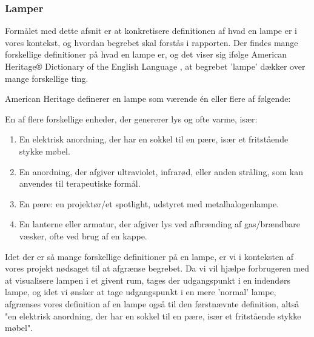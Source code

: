 \subsubsection{Lamper}
Formålet med dette afsnit er at konkretisere definitionen af hvad en lampe er i vores kontekst, og hvordan begrebet skal forstås i rapporten.
Der findes mange forskellige definitioner på hvad en lampe er, og det viser sig ifølge American Heritage® Dictionary of the English Language \cite{american_heritage}, at begrebet 'lampe' dækker over mange forskellige ting. 

American Heritage definerer en lampe som værende én eller flere af følgende:

En af flere forskellige enheder, der genererer lys og ofte varme, især:
\begin{enumerate}
    \item En elektrisk anordning, der har en sokkel til en pære, især et fritstående stykke møbel.
    \item En anordning, der afgiver ultraviolet, infrarød, eller anden stråling, som kan anvendes til terapeutiske formål.
    \item En pære: en projektør/et spotlight, udstyret med metalhalogenlampe.
    \item En lanterne eller armatur, der afgiver lys ved afbrænding af gas/brændbare væsker, ofte ved brug af en kappe.
\end{enumerate}

Idet der er så mange forskellige definitioner på en lampe, er vi i konteksten af vores projekt nødsaget til at afgrænse begrebet. Da vi vil hjælpe forbrugeren med at visualisere lampen i et givent rum, tages der udgangspunkt i en indendørs lampe, og idet vi ønsker at tage udgangspunkt i en mere 'normal' lampe, afgrænses vores definition af en lampe også til den førstnævnte definition, altså "en elektrisk anordning, der har en sokkel til en pære, især et fritstående stykke møbel".



